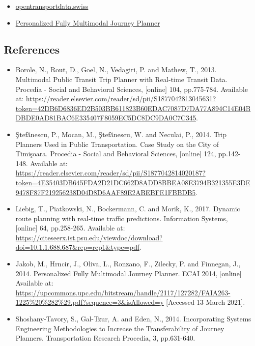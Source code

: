 \documentclass[
]{book}
\providecommand{\tightlist}{%
  \setlength{\itemsep}{0pt}\setlength{\parskip}{0pt}}
\begin{document}
\begin{itemize}
\tightlist
\item
  \href{https://opentransportdata.swiss/en/cookbook/open-journey-planner-ojp/}{opentransportdata.swiss}
\item
  \href{https://upcommons.upc.edu/bitstream/handle/2117/127282/FAIA263-1225\%20\%282\%29.pdf?sequence=3\&isAllowed=y}{Personalized Fully Multimodal Journey Planner}
\end{itemize}

\hypertarget{references-12}{%
\subsection*{References}\label{references-12}}

\begin{itemize}
\tightlist
\item
  Borole, N., Rout, D., Goel, N., Vedagiri, P. and Mathew, T., 2013. Multimodal Public Transit Trip Planner with Real-time Transit Data. Procedia - Social and Behavioral Sciences, {[}online{]} 104, pp.775-784. Available at: \url{https://reader.elsevier.com/reader/sd/pii/S1877042813045631?token=42DB6D6836ED2B503BB611823B60EDAC7087D7DA77A894C14E04BDBDE0AD81BAC6E335407F8059EC5DC8DC9DA0C7C345}.
\item
  Ştefănescu, P., Mocan, M., Ştefănescu, W. and Neculai, P., 2014. Trip Planners Used in Public Transportation. Case Study on the City of Timişoara. Procedia - Social and Behavioral Sciences, {[}online{]} 124, pp.142-148. Available at: \url{https://reader.elsevier.com/reader/sd/pii/S1877042814020187?token=4E35403DB645FDA2D21DC662D8ADD8BBEA08E3794B321355E3DE9478F87F219256238D04D8D6AAF89E2ABEBFE1FBBDB5}.
\item
  Liebig, T., Piatkowski, N., Bockermann, C. and Morik, K., 2017. Dynamic route planning with real-time traffic predictions. Information Systems, {[}online{]} 64, pp.258-265. Available at: \url{https://citeseerx.ist.psu.edu/viewdoc/download?doi=10.1.1.688.687\&rep=rep1\&type=pdf}.
\item
  Jakob, M., Hrncir, J., Oliva, L., Ronzano, F., Zilecky, P. and Finnegan, J., 2014. Personalized Fully Multimodal Journey Planner. ECAI 2014, {[}online{]} Available at: \url{https://upcommons.upc.edu/bitstream/handle/2117/127282/FAIA263-1225\%20\%282\%29.pdf?sequence=3\&isAllowed=y} {[}Accessed 13 March 2021{]}.
\item
  Shoshany-Tavory, S., Gal-Tzur, A. and Eden, N., 2014. Incorporating Systems Engineering Methodologies to Increase the Transferability of Journey Planners. Transportation Research Procedia, 3, pp.631-640.

\end{itemize}
\end{document}
